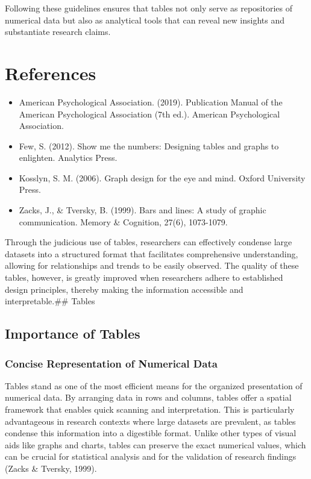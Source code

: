 \documentclass[
  b5paper]{book}
\providecommand{\tightlist}{%
  \setlength{\itemsep}{0pt}\setlength{\parskip}{0pt}}
\begin{document}
Following these guidelines ensures that tables not only serve as repositories of numerical data but also as analytical tools that can reveal new insights and substantiate research claims.

\hypertarget{references-3}{%
\section{References}\label{references-3}}

\begin{itemize}
\tightlist
\item
  American Psychological Association. (2019). Publication Manual of the American Psychological Association (7th ed.). American Psychological Association.
\item
  Few, S. (2012). Show me the numbers: Designing tables and graphs to enlighten. Analytics Press.
\item
  Kosslyn, S. M. (2006). Graph design for the eye and mind. Oxford University Press.
\item
  Zacks, J., \& Tversky, B. (1999). Bars and lines: A study of graphic communication. Memory \& Cognition, 27(6), 1073-1079.
\end{itemize}

Through the judicious use of tables, researchers can effectively condense large datasets into a structured format that facilitates comprehensive understanding, allowing for relationships and trends to be easily observed. The quality of these tables, however, is greatly improved when researchers adhere to established design principles, thereby making the information accessible and interpretable.\#\# Tables

\hypertarget{importance-of-tables-1}{%
\subsection{Importance of Tables}\label{importance-of-tables-1}}

\hypertarget{concise-representation-of-numerical-data-1}{%
\subsubsection{Concise Representation of Numerical Data}\label{concise-representation-of-numerical-data-1}}

Tables stand as one of the most efficient means for the organized presentation of numerical data. By arranging data in rows and columns, tables offer a spatial framework that enables quick scanning and interpretation. This is particularly advantageous in research contexts where large datasets are prevalent, as tables condense this information into a digestible format. Unlike other types of visual aids like graphs and charts, tables can preserve the exact numerical values, which can be crucial for statistical analysis and for the validation of research findings (Zacks \& Tversky, 1999).
\end{document}
